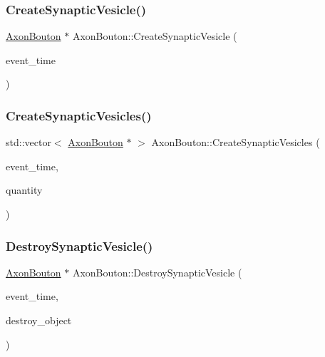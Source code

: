 \mbox{\label{classAxonBouton_a2aa0abe381f6e7c87c702189d01dfbf2}} 
\subsubsection{\texorpdfstring{Create\+Synaptic\+Vesicle()}{CreateSynapticVesicle()}}
{\footnotesize\ttfamily \mbox{\hyperlink{classAxonBouton}{Axon\+Bouton}} $\ast$ Axon\+Bouton\+::\+Create\+Synaptic\+Vesicle (\begin{DoxyParamCaption}\item[{std\+::chrono\+::time\+\_\+point$<$ \mbox{\hyperlink{universe_8h_a0ef8d951d1ca5ab3cfaf7ab4c7a6fd80}{Clock}} $>$}]{event\+\_\+time }\end{DoxyParamCaption})}

\mbox{\label{classAxonBouton_a0cabe429536722f14ae800c8579168b7}} 
\subsubsection{\texorpdfstring{Create\+Synaptic\+Vesicles()}{CreateSynapticVesicles()}}
{\footnotesize\ttfamily std\+::vector$<$ \mbox{\hyperlink{classAxonBouton}{Axon\+Bouton}} $\ast$ $>$ Axon\+Bouton\+::\+Create\+Synaptic\+Vesicles (\begin{DoxyParamCaption}\item[{std\+::chrono\+::time\+\_\+point$<$ \mbox{\hyperlink{universe_8h_a0ef8d951d1ca5ab3cfaf7ab4c7a6fd80}{Clock}} $>$}]{event\+\_\+time,  }\item[{int}]{quantity }\end{DoxyParamCaption})}

\mbox{\label{classAxonBouton_a75592b4ccc589db756183f4aaa694ffe}} 
\subsubsection{\texorpdfstring{Destroy\+Synaptic\+Vesicle()}{DestroySynapticVesicle()}}
{\footnotesize\ttfamily \mbox{\hyperlink{classAxonBouton}{Axon\+Bouton}} $\ast$ Axon\+Bouton\+::\+Destroy\+Synaptic\+Vesicle (\begin{DoxyParamCaption}\item[{std\+::chrono\+::time\+\_\+point$<$ \mbox{\hyperlink{universe_8h_a0ef8d951d1ca5ab3cfaf7ab4c7a6fd80}{Clock}} $>$}]{event\+\_\+time,  }\item[{\mbox{\hyperlink{classAxonBouton}{Axon\+Bouton}} $\ast$}]{destroy\+\_\+object }\end{DoxyParamCaption})}

